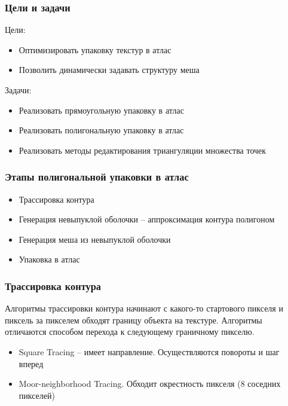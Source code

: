 \documentclass[10pt, unicode]{beamer}
\begin{document}
    \begin{frame}
        \frametitle{Цели и задачи}
        Цели:
        \begin{itemize}
            \item Оптимизировать упаковку текстур в атлас
            \item Позволить динамически задавать структуру меша
        \end{itemize}
        Задачи:
        \begin{itemize}
            \item Реализовать прямоугольную упаковку в атлас
            \item Реализовать полигональную упаковку в атлас
            \item Реализовать методы редактирования триангуляции множества точек
        \end{itemize}
    \end{frame}
    \begin{frame}
        \frametitle{Этапы полигональной упаковки в атлас}
        \begin{itemize}
            \item Трассировка контура
            \item Генерация невыпуклой оболочки -- аппроксимация контура полигоном
            \item Генерация меша из невыпуклой оболочки
            \item Упаковка в атлас
        \end{itemize}
    \end{frame}
    \begin{frame}
        \frametitle{Трассировка контура}
        Алгоритмы трассировки контура начинают с какого-то стартового пикселя и пиксель за пикселем обходят границу 
        объекта на текстуре. Алгоритмы отличаются способом перехода к следующему граничному пикселю. 
        \begin{itemize}
            \item Square Tracing -- имеет направление. Осуществляются повороты и шаг вперед
            \item Moor-neighborhood Tracing. Обходит окрестность пикселя (8 соседних пикселей)
        \end{itemize}
    \end{frame}
\end{document}
